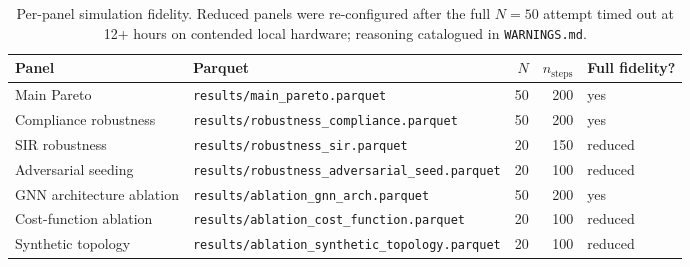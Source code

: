 \documentclass{article}
\begin{document}
\begin{table}[h]
\centering
\small
\begin{tabular}{llrrl}
\toprule
Panel & Parquet & $N$ & $n_{\mathrm{steps}}$ & Full fidelity? \\
\midrule
Main Pareto              & \texttt{results/main\_pareto.parquet}                    & 50 & 200 & yes \\
Compliance robustness    & \texttt{results/robustness\_compliance.parquet}          & 50 & 200 & yes \\
SIR robustness           & \texttt{results/robustness\_sir.parquet}                 & 20 & 150 & reduced \\
Adversarial seeding      & \texttt{results/robustness\_adversarial\_seed.parquet}   & 20 & 100 & reduced \\
GNN architecture ablation & \texttt{results/ablation\_gnn\_arch.parquet}            & 50 & 200 & yes \\
Cost-function ablation   & \texttt{results/ablation\_cost\_function.parquet}        & 20 & 100 & reduced \\
Synthetic topology       & \texttt{results/ablation\_synthetic\_topology.parquet}   & 20 & 100 & reduced \\
\bottomrule
\end{tabular}
\caption{Per-panel simulation fidelity. Reduced panels were
re-configured after the full $N = 50$ attempt timed out at 12+ hours
on contended local hardware; reasoning catalogued in
\texttt{WARNINGS.md}.}
\label{tab:fidelity}
\end{table}
\end{document}
